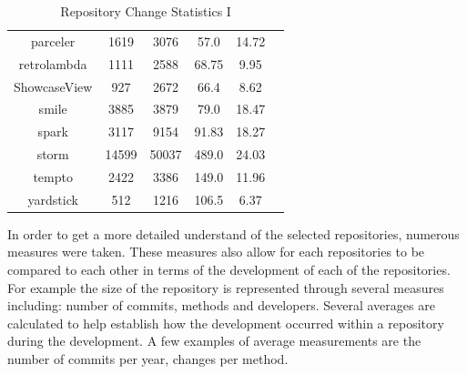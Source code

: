 \begin{table}
\begin{center}
\begin{tabular}{|c|c|c|c|c|c|}
        parceler & 1619 & 3076 & 57.0 & 14.72 \\
        retrolambda & 1111 & 2588 & 68.75 & 9.95 \\
        ShowcaseView & 927 & 2672 & 66.4 & 8.62 \\
        smile & 3885 & 3879 & 79.0 & 18.47 \\
        spark & 3117 & 9154 & 91.83 & 18.27 \\
        storm & 14599 & 50037 & 489.0 & 24.03 \\
        tempto & 2422 & 3386 & 149.0 & 11.96 \\
        yardstick & 512 & 1216 & 106.5 & 6.37 \\
        \hline
    \end{tabular}
\end{center}
\caption{Repository Change Statistics I}
\label{tab:repository_stats}
\end{table}

In order to get a more detailed understand of the selected repositories, numerous measures were taken. These measures also allow for each repositories to be compared to each other in terms of the development of each of the repositories. For example the size of the repository is represented through several measures including: number of commits, methods and developers. Several averages are calculated to help establish how the development occurred within a repository during the development. A few examples of average measurements are the number of commits per year, changes per method.

